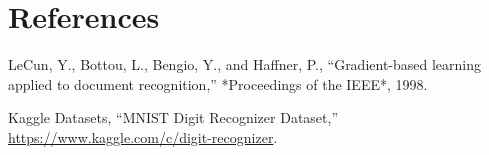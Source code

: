 \documentclass[12pt,a4paper]{article}
\begin{document}
\section{References}
\begin{enumerate}[label={[\arabic*]}, leftmargin=2em]
    \item LeCun, Y., Bottou, L., Bengio, Y., and Haffner, P., ``Gradient-based learning applied to document recognition,'' *Proceedings of the IEEE*, 1998.
    \item Kaggle Datasets, ``MNIST Digit Recognizer Dataset,'' \url{https://www.kaggle.com/c/digit-recognizer}.
\end{enumerate}
\end{document}

